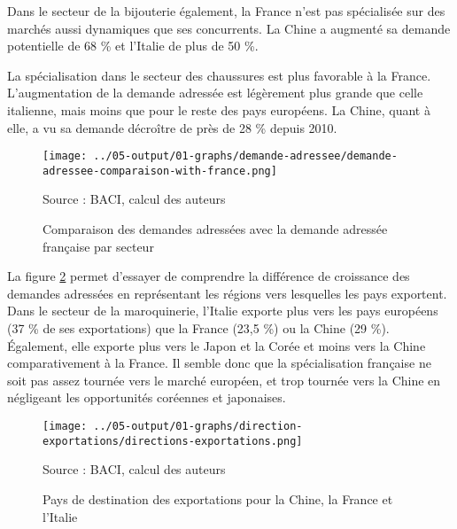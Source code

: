 \documentclass[french,10pt,a4paper]{article}
\begin{document}
Dans le secteur de la bijouterie également, la France n'est pas spécialisée sur des marchés aussi dynamiques que ses concurrents. La Chine a augmenté sa demande potentielle de 68 \% et l'Italie de plus de 50 \%.

La spécialisation dans le secteur des chaussures est plus favorable à la France. L'augmentation de la demande adressée est légèrement plus grande que celle italienne, mais moins que pour le reste des pays européens. La Chine, quant à elle, a vu sa demande décroître de près de 28 \% depuis 2010.

\begin{figure}[!h]
  \centering
  \texttt{[image: ../05-output/01-graphs/demande-adressee/demande-adressee-comparaison-with-france.png]}
  \captionsetup{justification=raggedright,singlelinecheck=false, font=small}
  \caption*{Source : BACI, calcul des auteurs}
  \captionsetup{justification=centering, singlelinecheck=true, font=normalsize}
  \caption{Comparaison des demandes adressées avec la demande adressée française par secteur}
  \label{fig:demande-adressee}
\end{figure}

\bigskip
La figure \ref{fig:direction-exportations} permet d'essayer de comprendre la différence de croissance des demandes adressées en représentant les régions vers lesquelles les pays exportent. Dans le secteur de la maroquinerie, l'Italie exporte plus vers les pays européens (37 \% de ses exportations) que la France (23,5 \%) ou la Chine (29 \%). Également, elle exporte plus vers le Japon et la Corée et moins vers la Chine comparativement à la France. Il semble donc que la spécialisation française ne soit pas assez tournée vers le marché européen, et trop tournée vers la Chine en négligeant les opportunités coréennes et japonaises.

\begin{figure}[!h]
  \centering
  \texttt{[image: ../05-output/01-graphs/direction-exportations/directions-exportations.png]}
  \captionsetup{justification=raggedright,singlelinecheck=false, font=small}
  \caption*{Source : BACI, calcul des auteurs}
  \captionsetup{justification=centering, singlelinecheck=true, font=normalsize}
  \caption{Pays de destination des exportations pour la Chine, la France et l'Italie}
  \label{fig:direction-exportations}
\end{figure}
\end{document}
